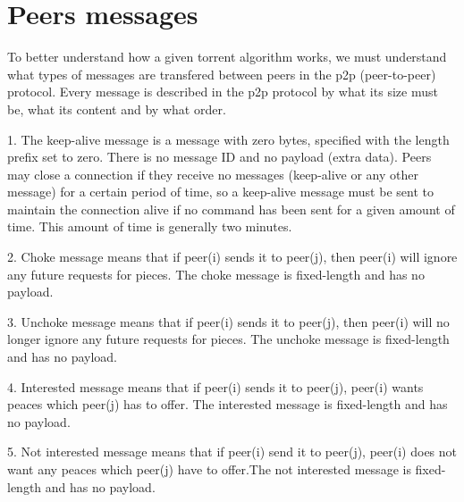 \documentclass[11pt]{article}
\begin{document}
  \section*{Peers messages}
  \begin{flushleft}

    To better understand how a given torrent algorithm works, we must understand what types of messages are transfered between peers in the p2p (peer-to-peer) protocol. Every message is described in the p2p protocol by what its size must be, what its content and by what order.

  \end{flushleft}
  \begin{flushleft}

    1. The keep-alive message is a message with zero bytes, specified with the length prefix set to zero. There is no message ID and no payload (extra data). Peers may close a connection if they receive no messages (keep-alive or any other message) for a certain period of time, so a keep-alive message must be sent to maintain the connection alive if no command has been sent for a given amount of time. This amount of time is generally two minutes.

  \end{flushleft}
  \begin{flushleft}

    2. Choke message means that if peer(i) sends it to peer(j), then peer(i) will ignore any future requests for pieces. The choke message is fixed-length and has no payload.

  \end{flushleft}
  \begin{flushleft}

    3. Unchoke message means that if peer(i) sends it to peer(j), then peer(i) will no longer ignore any future requests for pieces. The unchoke message is fixed-length and has no payload.

  \end{flushleft}
  \begin{flushleft}

    4. Interested message means that if peer(i) sends it to peer(j), peer(i) wants peaces which peer(j) has to offer.  The interested message is fixed-length and has no payload.

  \end{flushleft}
  \begin{flushleft}

    5. Not interested message means that if peer(i) send it to peer(j), peer(i) does not want any peaces which peer(j) have to offer.The not interested message is fixed-length and has no payload.

  \end{flushleft}
\end{document}
